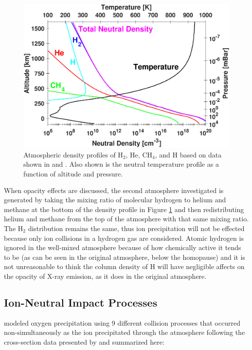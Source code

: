 \documentclass[draft]{agujournal2018}
\begin{document}
\begin{figure}[ht]
\centering
\includegraphics[width=\textwidth]{Figures/Atmosphere.eps}
\caption{Atmospheric density profiles of H$_{2}$, He, CH$_{4}$, and H based on data shown in \citet{maurellis2001} and \citet{sinclair2018}. Also shown is the neutral temperature profile as a function of altitude and pressure.}
\label{fig:atm}
\end{figure}

When opacity effects are discussed, the second atmosphere investigated is generated by taking the mixing ratio of molecular hydrogen to helium and methane at the bottom of the density profile in Figure \ref{fig:atm} and then redistributing helium and methane from the top of the atmosphere with that same mixing ratio.
The H$_{2}$ distribution remains the same, thus ion precipitation will not be effected because only ion collisions in a hydrogen gas are considered.
Atomic hydrogen is ignored in the well-mixed atmosphere because of how chemically active it tends to be (as can be seen in the original atmosphere, below the homopause) and it is not unreasonable to think the column density of H will have negligible affects on the opacity of X-ray emission, as it does in the original atmosphere.

\subsection{Ion-Neutral Impact Processes}

\citet{houston2018} modeled oxygen precipitation using 9 different collision processes that occurred non-simultaneously as the ion precipitated through the atmosphere following the cross-section data presented by \citet{schultz2017} and summarized here:
\end{document}
